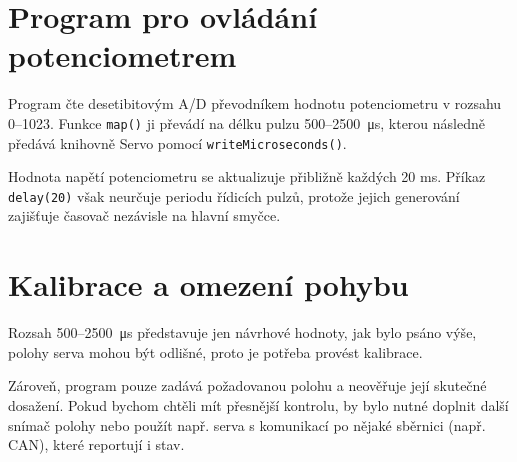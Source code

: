 \section{Program pro ovládání potenciometrem}

Program čte desetibitovým A/D převodníkem hodnotu potenciometru v rozsahu 0--1023. Funkce \texttt{map()} ji převádí na délku pulzu 500--2500~\si{\micro\second}, kterou následně předává knihovně Servo pomocí \texttt{writeMicroseconds()}.

\vspace{15px}
\noindent\begin{minipage}{\textwidth}

\end{minipage}

Hodnota napětí potenciometru se aktualizuje přibližně každých 20 ms. Příkaz \texttt{delay(20)} však neurčuje periodu řídicích pulzů, protože jejich generování zajišťuje časovač nezávisle na hlavní smyčce.

\section{Kalibrace a omezení pohybu}

Rozsah 500--2500~\si{\micro\second} představuje jen návrhové hodnoty, jak bylo psáno výše, polohy serva mohou být odlišné, proto je potřeba provést kalibrace.

Zároveň, program pouze zadává požadovanou polohu a neověřuje její skutečné dosažení. Pokud bychom chtěli mít přesnější kontrolu, by bylo nutné doplnit další snímač polohy nebo použít např. serva s komunikací po nějaké sběrnici (např. CAN), které reportují i stav.
